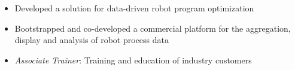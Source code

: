 \medskip

\begin{itemize}
  \item Developed a solution for data-driven robot program optimization
  \item Bootstrapped and co-developed a commercial platform for the aggregation, display and analysis of robot process data
  \item \textit{Associate Trainer}: Training and education of industry customers
\end{itemize}





